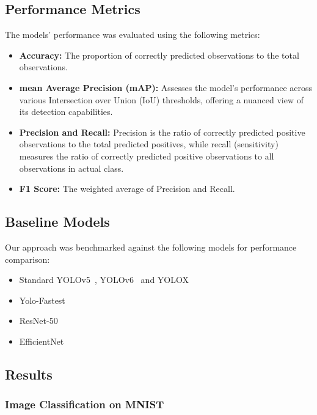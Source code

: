 \subsection{Performance Metrics}

The models' performance was evaluated using the following metrics:
\begin{itemize}
    \item \textbf{Accuracy:} The proportion of correctly predicted observations to the total observations.
    \item \textbf{mean Average Precision (mAP):} Assesses the model's performance across various Intersection over Union (IoU) thresholds, offering a nuanced view of its detection capabilities.
    \item \textbf{Precision and Recall:} Precision is the ratio of correctly predicted positive observations to the total predicted positives, while recall (sensitivity) measures the ratio of correctly predicted positive observations to all observations in actual class.
    \item \textbf{F1 Score:} The weighted average of Precision and Recall.
\end{itemize}

\subsection{Baseline Models}

Our approach was benchmarked against the following models for performance comparison:
\begin{itemize}
    \item Standard YOLOv5~\cite{ultralytics2021yolov5}, YOLOv6~\cite{li2022yolov6,li2023yolov6} and YOLOX~\cite{ge2021yolox}
    \item Yolo-Fastest~\cite{dog2021dog}
    \item ResNet-50~\cite{he2016deep}
    \item EfficientNet~\cite{tan2019efficientnet}
\end{itemize}

\subsection{Results}

\subsubsection{Image Classification on MNIST}


